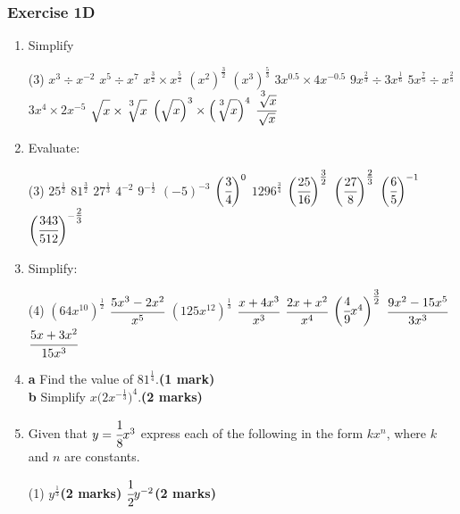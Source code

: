 \documentclass[fleqn]{article}
\newcommand{\exercise}{\subsubsection}
\begin{document}
\exercise{Exercise 1D}
\begin{enumerate}
	\item Simplify
		\begin{tasks}(3) %
			\task $x^3 \div x^{-2}$
			\task $x^5 \div x^7$
			\task $x^{\textstyle\frac{3}{2}} \times x^{\textstyle\frac{5}{2}}$
			\task $(x^2)^{\textstyle\frac{3}{2}}$
			\task $(x^3)^{\textstyle\frac{5}{3}}$
			\task $3x^{0.5} \times 4x^{-0.5}$
			\task $9x^{\textstyle\frac{2}{3}} \div 3x^{\textstyle\frac{1}{6}}$
			\task $5x^{\textstyle\frac{7}{5}} \div x^{\textstyle\frac{2}{5}}$
			\task $3x^4 \times 2x^{-5}$
			\task $\sqrt{\strut x} \times \sqrt[\textstyle{^3}]{\strut x}$
			\task $\Big(\sqrt{\strut x}\Big)^3 \times \Big(\sqrt[\textstyle{^3}]{\strut x}\Big)^4$
			\task $\cfrac{\sqrt[\textstyle{^3}]{ x}}{\sqrt{x}}$
		\end{tasks}
	\item Evaluate:
		\begin{tasks}(3)%
			\task $25^{\textstyle\frac{1}{2}}$
			\task $81^{\textstyle\frac{3}{2}}$
			\task $27^{\textstyle\frac{1}{3}}$
			\task $4^{-2}$
			\task $9^{-\textstyle\frac{1}{2}}$
			\task $(-5)^{-3}$
			\task $\bigg(\cfrac{3}{4}\bigg)^0$
			\task $1296^{\textstyle\frac{3}{4}}$
			\task $\bigg(\cfrac{25}{16}\bigg)^{\textstyle\frac{3}{2}}$
			\task $\bigg(\cfrac{27}{8}\bigg)^{\textstyle\frac{2}{3}}$
			\task $\bigg(\cfrac{6}{5}\bigg)^{-1}$
			\task $\bigg(\cfrac{343}{512}\bigg)^{-\textstyle\frac{2}{3}}$
		\end{tasks}
		\newpage
	\item Simplify:
		\vspace{-2mm}
		\begin{tasks}(4) %
			\task $(64x^{10})^{\textstyle\frac{1}{2}}$
			\task $\cfrac{5x^3-2x^2}{x^5}$
			\task $(125x^{12})^{\textstyle\frac{1}{3}}$
			\task $\cfrac{x+4x^3}{x^3}$
			\task $\cfrac{2x+x^2}{x^4}$
			\task $\bigg(\cfrac{4}{9}x^4\bigg)^{\textstyle\frac{3}{2}}$
			\task $\cfrac{9x^2-15x^5}{3x^3}$
			\task $\cfrac{5x+3x^2}{15x^3}$
		\end{tasks}
	\item \hspace*{2mm}\textbf{a}\hspace*{5mm} Find the value of $81^{\textstyle\frac{1}{4}}$.\hfill\textbf{(1 mark)}\vspace{1mm}\\
		  \hspace*{2mm}\textbf{b}\hspace*{5mm} Simplify $x\Big(2x^{-\textstyle\frac{1}{3}}\Big)^4$.\hfill\textbf{(2 marks)}
	\item Given that $y=\cfrac{1}{8}x^3$ express each of the following in the form $kx^n$, where $k$ and $n$ are constants.\vspace{-2mm}
		\begin{tasks}(1)
			\task $y^{\textstyle\frac{1}{3}}$\hfill\textbf{(2 marks)}\vspace{-1mm}
			\task $\cfrac{1}{2}y^{-2}$\hfill\textbf{(2 marks)}	
		\end{tasks}
\end{enumerate}
\end{document}
